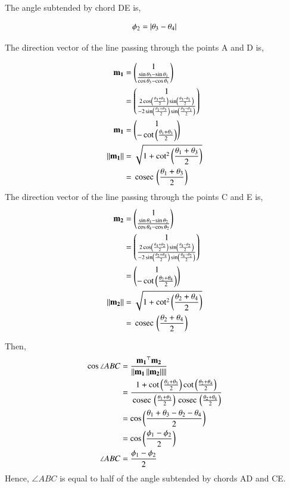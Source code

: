 \documentclass[journal,12pt,twocolumn]{IEEEtran}
\begin{document}
\begin{enumerate}
The angle subtended by chord DE is,

		\begin{align}
			\phi_2 = \left\vert\theta_3-\theta_4\right\vert
		\end{align}

The direction vector of the line passing through the points A and D is,

		\begin{align}
			\mathbf{m_1}&=\begin{pmatrix}1 \\ \frac{\sin \theta_3-\sin \theta_1}{\cos \theta_3-\cos \theta_1}\end{pmatrix}\\
			       &=\begin{pmatrix}1 \\ \frac{2\cos \left(\frac{\theta_3+\theta_1}{2}\right) \sin \left(\frac{\theta_3-\theta_1}{2}\right)}{-2\sin \left(\frac{\theta_1+\theta_3}{2}\right)\sin \left(\frac{\theta_3-\theta_1}{2}\right)}\end{pmatrix}\\
			\mathbf{m_1} &= \begin{pmatrix}1\\-\cot \left(\frac{\theta_1+\theta_3}{2}\right)\end{pmatrix}\\ 
			\left\lVert\mathbf{m_1}\right\rVert &= \sqrt{1+\cot^2 \left(\frac{\theta_1+\theta_3}{2}\right)}\\
					 &= \,\text{cosec}\, \left(\frac{\theta_1+\theta_3}{2}\right)
		\end{align}
The direction vector of the line passing through the points C and E is,
		\begin{align}
			\mathbf{m_2}&=\begin{pmatrix}1 \\ \frac{\sin \theta_4-\sin \theta_2}{\cos \theta_4-\cos \theta_2}\end{pmatrix}\\
			       &=\begin{pmatrix}1 \\ \frac{2\cos \left(\frac{\theta_4+\theta_2}{2}\right) \sin \left(\frac{\theta_4-\theta_2}{2}\right)}{-2\sin \left(\frac{\theta_2+\theta_4}{2}\right)\sin \left(\frac{\theta_4-\theta_2}{2}\right)}\end{pmatrix}\\
			       &=\begin{pmatrix}1 \\ -\cot \left(\frac{\theta_2+\theta_4}{2}\right)\end{pmatrix}\\ 
		       \left\lVert\mathbf{m_2}\right\rVert &= \sqrt{1+\cot^2 \left(\frac{\theta_2+\theta_4}{2}\right)}\\
					&= \,\text{cosec}\, \left(\frac{\theta_2+\theta_4}{2}\right)
		\end{align}

Then,
		\begin{align}
			\cos \angle ABC &= \frac{\mathbf{m_1}^{\top}\mathbf{m_2}}{\left\lVert\mathbf{m_1}\left\lVert\mathbf{m_2}\right\rVert\right\rVert}\\
					&= \frac{1+\cot \left(\frac{\theta_1+\theta_3}{2}\right) \cot \left(\frac{\theta_2+\theta_4}{2}\right)}{\,\text{cosec}\, \left(\frac{\theta_1+\theta_3}{2}\right) \,\text{cosec}\, \left(\frac{\theta_2+\theta_4}{2}\right)}\\
					&= \cos \left(\frac{\theta_1+\theta_3-\theta_2-\theta_4}{2}\right)\\
					&= \cos \left(\frac{\phi_1-\phi_2}{2}\right)\\
			     \angle ABC &= \frac{\phi_1-\phi_2}{2}
		\end{align}	
Hence, $\angle ABC$ is equal to half of the angle subtended by chords AD and CE.


\end{enumerate}
\end{document}
